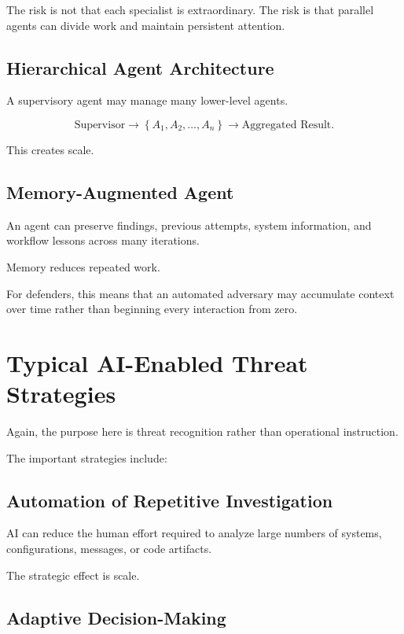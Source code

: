 The risk is not that each specialist is extraordinary. The risk is that parallel agents can divide work and maintain persistent attention.

\subsection{Hierarchical Agent Architecture}

A supervisory agent may manage many lower-level agents.

\begin{equation}
\text{Supervisor}
\rightarrow
\left\{
A_1,A_2,\ldots,A_n
\right\}
\rightarrow
\text{Aggregated Result}.
\end{equation}

This creates scale.

\subsection{Memory-Augmented Agent}

An agent can preserve findings, previous attempts, system information, and workflow lessons across many iterations.

Memory reduces repeated work.

For defenders, this means that an automated adversary may accumulate context over time rather than beginning every interaction from zero.

\section{Typical AI-Enabled Threat Strategies}

Again, the purpose here is threat recognition rather than operational instruction.

The important strategies include:

\subsection{Automation of Repetitive Investigation}

AI can reduce the human effort required to analyze large numbers of systems, configurations, messages, or code artifacts.

The strategic effect is scale.

\subsection{Adaptive Decision-Making}

